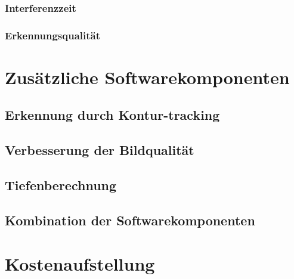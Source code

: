 \subsubsection{Interferenzzeit}

\subsubsection{Erkennungsqualität}

\section{Zusätzliche Softwarekomponenten}

\subsection{Erkennung durch Kontur-tracking}

\subsection{Verbesserung der Bildqualität}

\subsection{Tiefenberechnung} \label{cap:calc_depth}

\subsection{Kombination der Softwarekomponenten}

\section{Kostenaufstellung}

